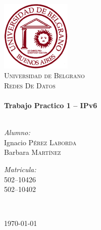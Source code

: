 \begin{titlepage}

\begin{center}

\includegraphics[width=0.25\textwidth]{./logo_UB.png}\\[1cm] 

\textsc{\LARGE Universidad de Belgrano}\\[1.5cm]

\textsc{\Large Redes De Datos}\\[0.5cm]

\HRule \\[0.4cm]
{ \huge \bfseries Trabajo Practico 1 -- IPv6}\\[0.4cm]
\HRule \\[1.5cm]

\begin{minipage}{0.4\textwidth}
\begin{flushleft} \large
\emph{Alumno:}\\
Ignacio \textsc{P\'erez Laborda}\\
Barbara \textsc{Mart\'inez}\\
\end{flushleft}
\end{minipage}
\begin{minipage}{0.4\textwidth}
\begin{flushright} \large
\emph{Matricula:} \\
502--10426\\
502--10402\\
\end{flushright}
\end{minipage}\\[1.5cm]

\vfill

{\large \today}

\end{center}

\end{titlepage}
